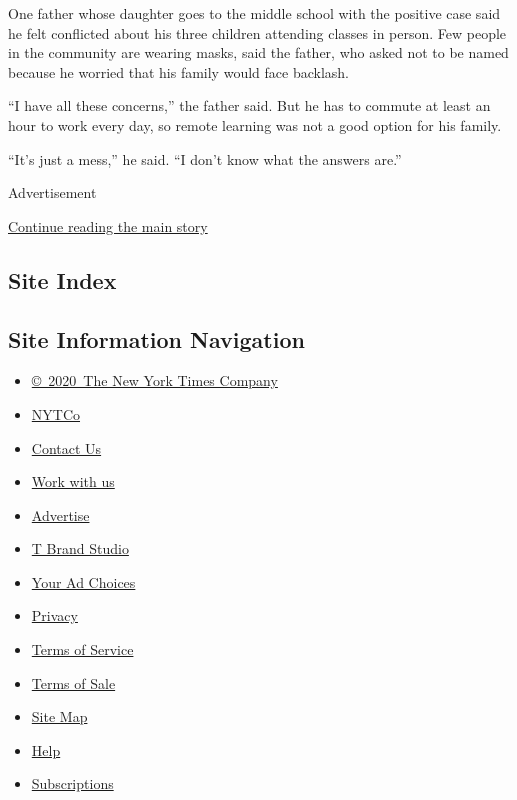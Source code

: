One father whose daughter goes to the middle school with the positive
case said he felt conflicted about his three children attending classes
in person. Few people in the community are wearing masks, said the
father, who asked not to be named because he worried that his family
would face backlash.

``I have all these concerns,'' the father said. But he has to commute at
least an hour to work every day, so remote learning was not a good
option for his family.

``It's just a mess,'' he said. ``I don't know what the answers are.''

Advertisement

\protect\hyperlink{after-bottom}{Continue reading the main story}

\hypertarget{site-index}{%
\subsection{Site Index}\label{site-index}}

\hypertarget{site-information-navigation}{%
\subsection{Site Information
Navigation}\label{site-information-navigation}}

\begin{itemize}
\tightlist
\item
  \href{https://help.nytimes3xbfgragh.onion/hc/en-us/articles/115014792127-Copyright-notice}{©~2020~The
  New York Times Company}
\end{itemize}

\begin{itemize}
\tightlist
\item
  \href{https://www.nytco.com/}{NYTCo}
\item
  \href{https://help.nytimes3xbfgragh.onion/hc/en-us/articles/115015385887-Contact-Us}{Contact
  Us}
\item
  \href{https://www.nytco.com/careers/}{Work with us}
\item
  \href{https://nytmediakit.com/}{Advertise}
\item
  \href{http://www.tbrandstudio.com/}{T Brand Studio}
\item
  \href{https://www.nytimes3xbfgragh.onion/privacy/cookie-policy\#how-do-i-manage-trackers}{Your
  Ad Choices}
\item
  \href{https://www.nytimes3xbfgragh.onion/privacy}{Privacy}
\item
  \href{https://help.nytimes3xbfgragh.onion/hc/en-us/articles/115014893428-Terms-of-service}{Terms
  of Service}
\item
  \href{https://help.nytimes3xbfgragh.onion/hc/en-us/articles/115014893968-Terms-of-sale}{Terms
  of Sale}
\item
  \href{https://spiderbites.nytimes3xbfgragh.onion}{Site Map}
\item
  \href{https://help.nytimes3xbfgragh.onion/hc/en-us}{Help}
\item
  \href{https://www.nytimes3xbfgragh.onion/subscription?campaignId=37WXW}{Subscriptions}
\end{itemize}
